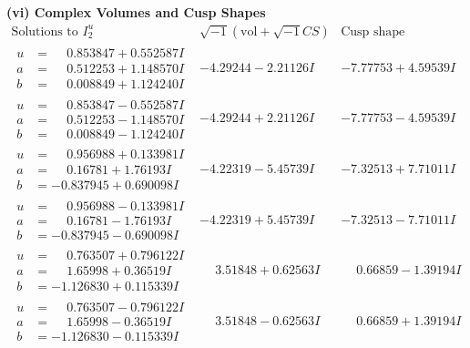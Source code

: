 \documentclass[1p]{elsarticle_modified}
\theoremstyle{definition}
\newcommand{\I}{\sqrt{-1}}
\begin{document}
\newpage\flushleft \textbf{(vi) Complex Volumes and Cusp Shapes}
$$\begin{array}{c|c|c}  
\text{Solutions to }I^u_{2}& \I (\text{vol} + \sqrt{-1}CS) & \text{Cusp shape}\\
 \hline 
\begin{aligned}
u &= \phantom{-}0.853847 + 0.552587 I \\
a &= \phantom{-}0.512253 + 1.148570 I \\
b &= \phantom{-}0.008849 + 1.124240 I\end{aligned}
 & -4.29244 - 2.21126 I & -7.77753 + 4.59539 I \\ \hline\begin{aligned}
u &= \phantom{-}0.853847 - 0.552587 I \\
a &= \phantom{-}0.512253 - 1.148570 I \\
b &= \phantom{-}0.008849 - 1.124240 I\end{aligned}
 & -4.29244 + 2.21126 I & -7.77753 - 4.59539 I \\ \hline\begin{aligned}
u &= \phantom{-}0.956988 + 0.133981 I \\
a &= \phantom{-}0.16781 + 1.76193 I \\
b &= -0.837945 + 0.690098 I\end{aligned}
 & -4.22319 - 5.45739 I & -7.32513 + 7.71011 I \\ \hline\begin{aligned}
u &= \phantom{-}0.956988 - 0.133981 I \\
a &= \phantom{-}0.16781 - 1.76193 I \\
b &= -0.837945 - 0.690098 I\end{aligned}
 & -4.22319 + 5.45739 I & -7.32513 - 7.71011 I \\ \hline\begin{aligned}
u &= \phantom{-}0.763507 + 0.796122 I \\
a &= \phantom{-}1.65998 + 0.36519 I \\
b &= -1.126830 + 0.115339 I\end{aligned}
 & \phantom{-}3.51848 + 0.62563 I & \phantom{-}0.66859 - 1.39194 I \\ \hline\begin{aligned}
u &= \phantom{-}0.763507 - 0.796122 I \\
a &= \phantom{-}1.65998 - 0.36519 I \\
b &= -1.126830 - 0.115339 I\end{aligned}
 & \phantom{-}3.51848 - 0.62563 I & \phantom{-}0.66859 + 1.39194 I \\ \hline\begin{aligned}

\end{aligned}
\end{array}$$
\end{document}
